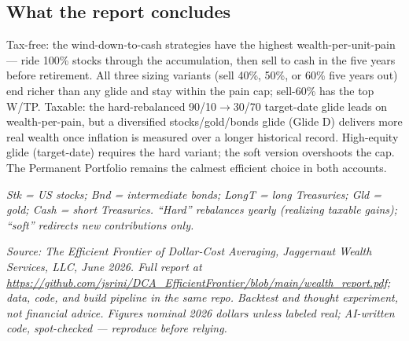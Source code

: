 \documentclass[9pt]{extarticle}
\begin{document}
\subsection*{What the report concludes}
Tax-free: the wind-down-to-cash strategies have the highest wealth-per-unit-pain --- ride 100\% stocks through the accumulation, then sell to cash in the five years before retirement. All three sizing variants (sell 40\%, 50\%, or 60\% five years out) end richer than any glide and stay within the pain cap; sell-60\% has the top W/TP. Taxable: the hard-rebalanced 90/10$\to$30/70 target-date glide leads on wealth-per-pain, but a diversified stocks/gold/bonds glide (Glide D) delivers more real wealth once inflation is measured over a longer historical record. High-equity glide (target-date) requires the hard variant; the soft version overshoots the cap. The Permanent Portfolio remains the calmest efficient choice in both accounts.

\vspace{2pt}
{\footnotesize\itshape Stk = US stocks; Bnd = intermediate bonds; LongT = long Treasuries; Gld = gold; Cash = short Treasuries. ``Hard'' rebalances yearly (realizing taxable gains); ``soft'' redirects new contributions only.}

\vspace{1pt}
{\footnotesize\itshape Source: The Efficient Frontier of Dollar-Cost Averaging, Jaggernaut Wealth Services, LLC, June 2026. Full report at \url{https://github.com/jsrini/DCA_EfficientFrontier/blob/main/wealth_report.pdf}; data, code, and build pipeline in the same repo. Backtest and thought experiment, not financial advice. Figures nominal 2026 dollars unless labeled real; AI-written code, spot-checked --- reproduce before relying.}
\end{document}
